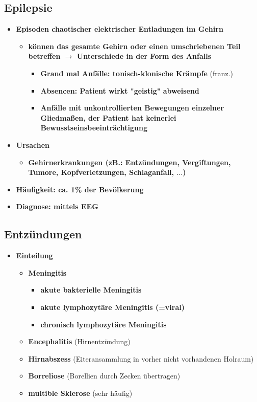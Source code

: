 \subsection{Epilepsie}
	\begin{itemize}
		\item \textbf{Episoden chaotischer elektrischer Entladungen im Gehirn}
			\begin{itemize}
				\item \textbf{können das gesamte Gehirn oder einen umschriebenen Teil betreffen $\rightarrow$ Unterschiede in der Form des Anfalls}
					\begin{itemize}
						\item \textbf{Grand mal Anfälle: tonisch-klonische Krämpfe} (franz.)
						\item \textbf{Absencen: Patient wirkt "geistig" abweisend}
						\item \textbf{Anfälle mit unkontrollierten Bewegungen einzelner Gliedmaßen, der Patient hat keinerlei Bewusstseinsbeeinträchtigung}
					\end{itemize}
			\end{itemize}
		\item \textbf{Ursachen}
			\begin{itemize}
				\item \textbf{Gehirnerkrankungen (zB.: Entzündungen, Vergiftungen, Tumore, Kopfverletzungen, Schlaganfall, $\dots$)}
			\end{itemize}
		\item \textbf{Häufigkeit: ca. 1\% der Bevölkerung}
		\item \textbf{Diagnose: mittels EEG}
	\end{itemize}
	
\subsection{Entzündungen}
	\begin{itemize}
		\item \textbf{Einteilung}
			\begin{itemize}
				\item \textbf{Meningitis}
					\begin{itemize}
						\item \textbf{akute bakterielle Meningitis}
						\item \textbf{akute lymphozytäre Meningitis (=viral)}
						\item \textbf{chronisch lymphozytäre Meningitis}
					\end{itemize}
				\item \textbf{Encephalitis} (Hirnentzündung)
				\item \textbf{Hirnabszess} (Eiteransammlung in vorher nicht vorhandenen Holraum)
				\item \textbf{Borreliose} (Borellien durch Zecken übertragen)
				\item \textbf{multible Sklerose} (sehr häufig)
			\end{itemize}
	\end{itemize}
